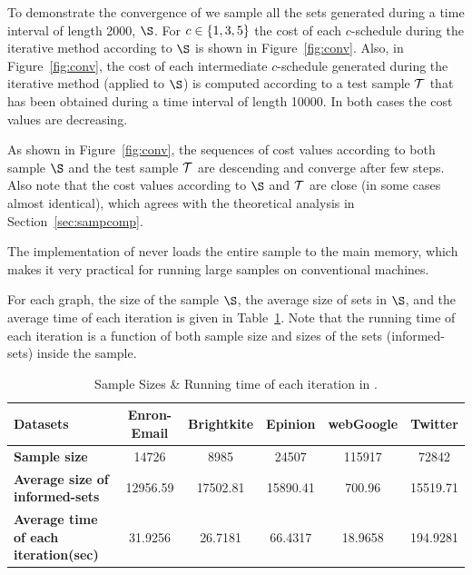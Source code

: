 To demonstrate the convergence of {\appoptimizer} we sample all the sets generated during a time interval of length 2000, $\S$. For $c\in\left\{1,3,5\right\}$ the cost of each $c$-schedule during the iterative method according to $\S$ is shown in Figure~\ref{fig:conv}. Also, in Figure~\ref{fig:conv}, the cost of each intermediate $c$-schedule generated during the iterative method (applied to $\S$) is computed according to a test sample $\mathcal{T}$ that has been obtained during a time interval of length 10000. In both cases the cost values are decreasing. 



As shown in Figure~\ref{fig:conv}, the sequences of cost values according to both sample $\S$ and the test sample $\mathcal{T}$ are descending and converge after few steps. Also note that the cost values according to $\S$ and $\mathcal{T}$ are close (in some cases almost identical), which agrees with the theoretical analysis in Section~\ref{sec:sampcomp}.






\begin{remark}
The implementation of {\appoptimizer} never loads the entire sample to the main memory, which makes it very practical for running large samples on conventional machines.
\end{remark}



For each graph, the size of the sample $\S$, the average size of sets in $\S$, and the average time of each iteration is given in Table~\ref{table:time}. Note that the running time of each iteration is a function of both sample size and sizes of the sets (informed-sets) inside the sample.

\begin{table}[h]
\begin{tabular}{|l|c|c|c|c|c|}
\hline
{\bf Datasets}& Enron-Email & Brightkite & Epinion  & webGoogle & Twitter\\
\hline \hline
{\bf Sample size}& 14726 & 8985 & 24507 & 115917 & 72842 \\
\hline
{\bf Average size of informed-sets}& 12956.59 & 17502.81 & 15890.41 & 700.96  & 15519.71 \\
\hline
{\bf Average time of each iteration(sec)}& 31.9256 & 26.7181&  66.4317&  18.9658&  194.9281\\
\hline
\end{tabular}
\caption{Sample Sizes \& Running time of each iteration in {\appoptimizer}.}\label{table:time}
\end{table}

